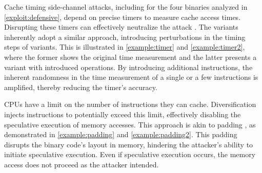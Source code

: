 \begin{strategy}
    Cache timing side-channel attacks, including for the four binaries analyzed in \autoref{exploit:defensive}, depend on precise timers to measure cache access times. 
    Disrupting these timers can effectively neutralize the attack \cite{JStimers}. 
    The \Wasm variants inherently adopt a similar approach, introducing perturbations in the timing steps of \Wasm variants. 
    This is illustrated in \autoref{example:timer} and \autoref{example:timer2}, where the former shows the original time measurement and the latter presents a variant with introduced operations.
    By introducing additional instructions, the inherent randomness in the time measurement of a single or a few instructions is amplified, thereby reducing the timer's accuracy.

    
\end{strategy}



\begin{strategy}
    CPUs have a limit on the number of instructions they can cache. 
    Diversification injects instructions to potentially exceed this limit, effectively disabling the speculative execution of memory accesses. 
    This approach is akin to padding \cite{padding}, as demonstrated in \autoref{example:padding} and \autoref{example:padding2}.
    This padding disrupts the binary code's layout in memory, hindering the attacker's ability to initiate speculative execution. 
    Even if speculative execution occurs, the memory access does not proceed as the attacker intended.
    
    
    
\end{strategy}





